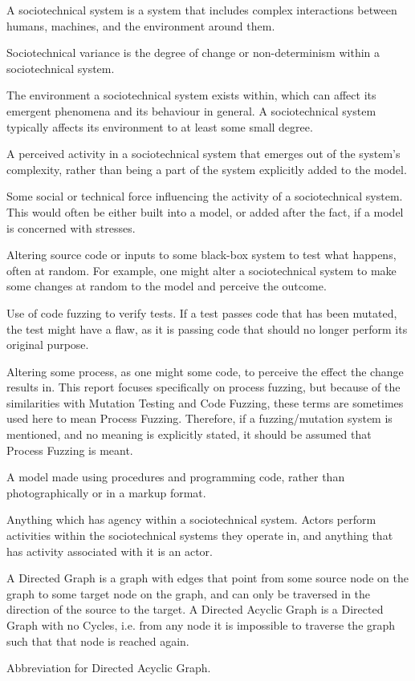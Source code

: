 \begin{description}[align=right,labelwidth=3cm]
    \item [Sociotechnical System:] A sociotechnical system is a system that includes complex interactions between humans, machines, and the environment around them.\cite{Baxter2011}
    \item [Sociotechnical Variance:] Sociotechnical variance is the degree of change or non-determinism within a sociotechnical system.
    \item [Sociotechnical Environment:] The environment a sociotechnical system exists within, which can affect its emergent phenomena and its behaviour in general. A sociotechnical system typically affects its environment to at least some small degree.
    \item [Emergent Phenomena:] A perceived activity in a sociotechnical system that emerges out of the system's complexity, rather than being a part of the system explicitly added to the model. 
    \item [Sociotechnical Stress:] Some social or technical force influencing the activity of a sociotechnical system. This would often be either built into a model, or added after the fact, if a model is concerned with stresses. 
    \item [Code Fuzzing:] Altering source code or inputs to some black-box system to test what happens, often at random\cite{Miller1988}. For example, one might alter a sociotechnical system to make some changes at random to the model and perceive the outcome.
    \item [Mutation Testing:] Use of code fuzzing to verify tests. If a test passes code that has been mutated, the test might have a flaw, as it is passing code that should no longer perform its original purpose. 
    \item [Process Fuzzing:] Altering some process, as one might some code, to perceive the effect the change results in. This report focuses specifically on process fuzzing, but because of the similarities with Mutation Testing and Code Fuzzing, these terms are sometimes used here to mean Process Fuzzing. Therefore, if a fuzzing/mutation system is mentioned, and no meaning is explicitly stated, it should be assumed that Process Fuzzing is meant. 
    \item [Procedural Model:] A model made using procedures and programming code, rather than photographically or in a markup format.
    \item [Actor:] Anything which has agency within a sociotechnical system. Actors perform activities within the sociotechnical systems they operate in, and anything that has activity associated with it is an actor. 
    \item [Directed Acyclic Graph:] A Directed Graph is a graph\cite{Christofides:1975:GTA:1098653} with edges that point from some source node on the graph to some target node on the graph, and can only be traversed in the direction of the source to the target. A Directed Acyclic Graph is a Directed Graph with no Cycles, i.e. from any node it is impossible to traverse the graph such that that node is reached again.
    \item [DAG:] Abbreviation for Directed Acyclic Graph.
\end{description}